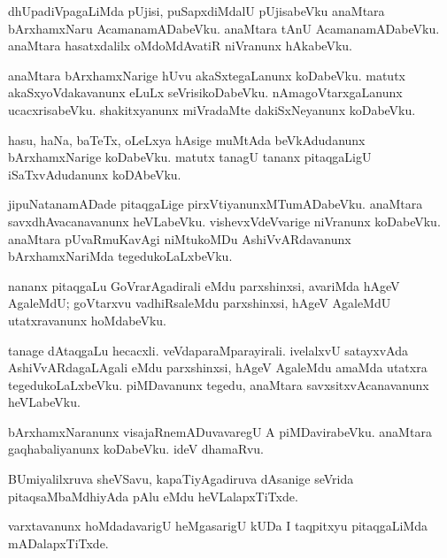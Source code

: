 \documentclass{article}
\begin{document}
\begin{mn}
dhUpadiVpagaLiMda pUjisi, puSapxdiMdalU pUjisabeVku anaMtara
bArxhamxNaru AcamanamADabeVku. anaMtara tAnU
AcamanamADabeVku. anaMtara hasatxdalilx oMdoMdAvatiR niVranunx hAkabeVku.
\end{mn}

\begin{mn}%
anaMtara bArxhamxNarige hUvu akaSxtegaLanunx koDabeVku. matutx
akaSxyoVdakavanunx eLuLx seVrisikoDabeVku. nAmagoVtarxgaLanunx
ucacxrisabeVku. shakitxyanunx miVradaMte dakiSxNeyanunx koDabeVku.
\end{mn}

\begin{mn}
hasu, haNa, baTeTx, oLeLxya hAsige muMtAda beVkAdudanunx
bArxhamxNarige koDabeVku. matutx tanagU tananx pitaqgaLigU
iSaTxvAdudanunx koDAbeVku.
\end{mn}

\begin{mn}
jipuNatanamADade pitaqgaLige pirxVtiyanunxMTumADabeVku. anaMtara
savxdhAvacanavanunx heVLabeVku. vishevxVdeVvarige niVranunx
koDabeVku. anaMtara pUvaRmuKavAgi niMtukoMDu AshiVvARdavanunx
bArxhamxNariMda tegedukoLaLxbeVku.
\end{mn}

\begin{mn}
nananx pitaqgaLu GoVrarAgadirali eMdu parxshinxsi, avariMda hAgeV
AgaleMdU; goVtarxvu vadhiRsaleMdu parxshinxsi, hAgeV AgaleMdU
utatxravanunx hoMdabeVku.
\end{mn}

\begin{mn}%
tanage dAtaqgaLu hecacxli. veVdaparaMparayirali. ivelalxvU satayxvAda
AshiVvARdagaLAgali eMdu parxshinxsi, hAgeV AgaleMdu amaMda utatxra
tegedukoLaLxbeVku. piMDavanunx tegedu, anaMtara savxsitxvAcanavanunx heVLabeVku.
\end{mn}

\begin{mn}
bArxhamxNaranunx visajaRnemADuvavaregU A piMDavirabeVku. anaMtara
gaqhabaliyanunx koDabeVku. ideV dhamaRvu.
\end{mn}

\begin{mn}
BUmiyalilxruva sheVSavu, kapaTiyAgadiruva dAsanige seVrida
pitaqsaMbaMdhiyAda pAlu eMdu heVLalapxTiTxde.
\end{mn}

\begin{mn}
varxtavanunx hoMdadavarigU heMgasarigU kUDa I taqpitxyu pitaqgaLiMda mADalapxTiTxde.
\end{mn}
\end{document}
